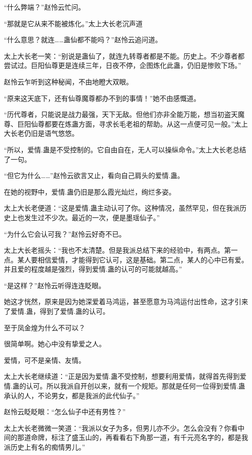 \begin{this_body}
“什么弊端？”赵怜云忙问。

“那就是它从来不能被炼化。”太上大长老沉声道

“什么意思？就连……蛊仙都不能吗？”赵怜云追问道。

太上大长老一笑：“别说是蛊仙了，就连九转尊者都是不能。历史上。不少尊者都尝试过。巨阳仙尊更是连续三年，日夜不停，企图炼化此蛊，仍旧是惨败下场。”

赵怜云乍听到这种秘闻，不由地瞪大双眼。

“原来这天底下，还有仙尊魔尊都办不到的事情！”她不由感慨道。

“历代尊者，只能说是战力最强，天下无敌。但他们亦非全能万能，想当初盗天魔尊、巨阳仙尊都要在炼蛊方面，寻求长毛老祖的帮助。从这一点便可见一般。”太上大长老仍旧是语气悠悠。

“所以，爱情.蛊是不受控制的。它自由自在，无人可以操纵命令。”太上大长老总结了一句。

“但它为什么……”赵怜云欲言又止，看向自己肩头的爱情.蛊。

在她的视野中，爱情.蛊仍旧是那么霞光灿烂，绚烂多姿。

太上大长老便道：“这是爱情.蛊主动认可了你。这种情况，虽然罕见，但在我派历史上也发生过不少次。最近的一次，便是墨瑶仙子。”

“为什么它会认可我？”赵怜云好奇不已。

太上大长老摇头：“我也不太清楚。但是我派总结下来的经验中，有两点。第一点。某人要相信爱情，才能得到它认可，这是基础。第二点，某人的心中已有爱。并且爱的程度越是强烈，得到爱情.蛊的认可的可能就越高。”

“是这样？”赵怜云听得连连眨眼。

她这才恍然，原来是因为她深爱着马鸿运，甚至愿意为马鸿运付出性命，这才引来了爱情.蛊，得到了爱情.蛊的认可。

至于凤金煌为什么不可以？

很简单啊。她心中没有挚爱之人。

爱情，可不是亲情、友情。

太上大长老继续道：“正是因为爱情.蛊不受控制，想要利用爱情，就得首先得到爱情.蛊的认可。所以我派自开创以来，就有一个规矩。那就是任何一位得到爱情.蛊承认的人，不论男女，都是我派的此代仙子。”

赵怜云眨眨眼：“怎么仙子中还有男性？”

太上大长老微微一笑道：“我派以女子为多，但男儿亦不少。怎么会没有？你看中间的那道命牌，标注了盛玉山的，再看看右下角那一道，有千元亮名字的，都是我派历史上有名的痴情男儿。”


\end{this_body}
